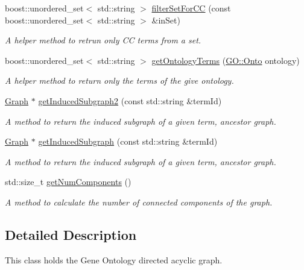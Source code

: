 \begin{DoxyCompactItemize}
boost\+::unordered\+\_\+set$<$ std\+::string $>$ \hyperlink{classGoGraph_a23fc2ff15da505fa77536adbd9b7d01b}{filter\+Set\+For\+CC} (const boost\+::unordered\+\_\+set$<$ std\+::string $>$ \&in\+Set)
\begin{DoxyCompactList}\small\item\em A helper method to retrun only CC terms from a set. \end{DoxyCompactList}\item 
boost\+::unordered\+\_\+set$<$ std\+::string $>$ \hyperlink{classGoGraph_abaa3ff8f11463a38fd03241ff17d3e75}{get\+Ontology\+Terms} (\hyperlink{namespaceGO_a5ae335887b5cf40a9ef3045be9247fc3}{G\+O\+::\+Onto} ontology)
\begin{DoxyCompactList}\small\item\em A helper method to return only the terms of the give ontology. \end{DoxyCompactList}\item 
\hyperlink{classGoGraph_aae4ae00d4785dcee01a514feb768f380}{Graph} $\ast$ \hyperlink{classGoGraph_a523911c2ddaff88ea64c8f15a01f9fee}{get\+Induced\+Subgraph2} (const std\+::string \&term\+Id)
\begin{DoxyCompactList}\small\item\em A method to return the induced subgraph of a given term, ancestor graph. \end{DoxyCompactList}\item 
\hyperlink{classGoGraph_aae4ae00d4785dcee01a514feb768f380}{Graph} $\ast$ \hyperlink{classGoGraph_a6ec3b30ab6fbd458b4225ec9532a4e14}{get\+Induced\+Subgraph} (const std\+::string \&term\+Id)
\begin{DoxyCompactList}\small\item\em A method to return the induced subgraph of a given term, ancestor graph. \end{DoxyCompactList}\item 
std\+::size\+\_\+t \hyperlink{classGoGraph_a6ce05821a7dfa86e1fa1de412d2c6cb2}{get\+Num\+Components} ()
\begin{DoxyCompactList}\small\item\em A method to calculate the number of connected components of the graph. \end{DoxyCompactList}\end{DoxyCompactItemize}


\subsection{Detailed Description}
This class holds the Gene Ontology directed acyclic graph. 

